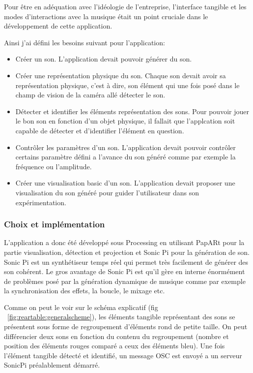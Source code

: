 Pour être en adéquation avec l'idéologie de l'entreprise, l'interface tangible et les modes d'interactions avec la musique était un point cruciale dans le développement de cette application.

Ainsi j'ai défini les besoins suivant pour l'application:
\begin{itemize}
\item Créer un son. L'application devait pouvoir générer du son.
\item Créer une représentation physique du son. Chaque son devait avoir sa représentation physique, c'est à dire, son élément qui une fois posé dans le champ de vision de la caméra allé détecter le son.
\item Détecter et identifier les éléments représentation des sons. Pour pouvoir jouer le bon son en fonction d'un objet physique, il fallait que l'applcation soit capable de détecter et d'identifier l'élément en question.
\item Contrôler les paramètres d'un son. L'application devait pouvoir contrôler certains paramètre défini a l'avance du son généré comme par exemple la fréquence ou l'amplitude.
\item Créer une visualisation basic d'un son. L'application devait proposer une visualisation du son généré pour guider l'utilisateur dans son expérimentation.
\end{itemize}

\subsubsection{Choix et implémentation}
L'application a donc été développé sous Processing en utilisant PapARt pour la partie visualisation, détection et projection et Sonic Pi pour la génération de son.
Sonic Pi est un synthétiseur temps réel qui permet très facilement de générer des son cohérent. Le gros avantage de Sonic Pi est qu'il gère en interne énormément de problèmes posé par la génération dynamique de musique comme par exemple la synchronisation des effets, la boucle, le mixage etc.

Comme on peut le voir sur le schéma explicatif (fig ~\ref{fig:reartable:generalscheme}), les éléments tangible représentant des sons se présentent sous forme de regroupement d'éléments rond de petite taille. On peut différencier deux sons en fonction du contenu du regroupement (nombre et position des éléments rouges comparé a ceux des éléments bleu).
Une fois l'élément tangible détecté et identifié, un message OSC est envoyé a un serveur SonicPi préalablement démarré.


